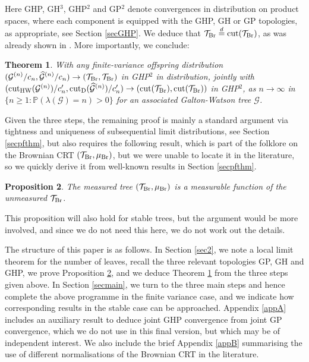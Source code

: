 \documentclass[11pt,a4paper]{article}
\newtheorem{prop}{Proposition}[section]
\newtheorem{thm}[prop]{Theorem}
\newcommand{\bP}{\mathbb{P}}
\newcommand{\cG}{\mathcal{G}}
\newcommand{\cT}{\mathcal{T}}
\newcommand{\modcut}{{\rm cut}_{\rm HW}}
\begin{document}
Here GHP, GH$^3$, GHP$^2$ and GP$^2$ denote convergences in distribution on product spaces, where each component is equipped with the GHP, GH or GP topologies, as appropriate, see Section \ref{secGHP}. We deduce that $\cT_{\rm Br}\overset{d}{=}{\rm cut}(\cT_{\rm Br})$, as was already shown in \cite{BM}. More importantly, we conclude:
\begin{thm}\label{thm1} With any finite-variance offspring distribution $\displaystyle(\cG^{(n)}/c_n,\widehat{\cG}^{(n)}/c_n)\rightarrow(\cT_{\rm Br},\cT_{\rm Br})$ in {\rm GHP}$^2$ in distribution,
  jointly with $(\modcut(\cG^{(n)})/c_n^\prime,{\rm cut}_{\rm D}(\widehat{\cG}^{(n)})/c_n^\prime)\rightarrow({\rm cut}(\cT_{\rm Br}),{\rm cut}(\cT_{\rm Br}))$
  in {\rm GHP}$^2$, as $n\rightarrow\infty$ in $\{n\ge 1\colon\bP(\lambda(\cG)=n)>0\}$ for an associated Galton-Watson tree $\cG$.
\end{thm}
Given the three steps, the remaining proof is mainly a standard argument via tightness and uniqueness of subsequential limit distributions, see Section \ref{secpfthm}, but also requires the following result, which is part of the folklore on the Brownian CRT $(\cT_{\rm Br},\mu_{\rm Br})$, but we were unable to locate it in the literature, so we quickly derive it from well-known results in Section \ref{secpfthm}.

\begin{prop}\label{propintro} The measured tree $(\cT_{\rm Br},\mu_{\rm Br})$ is a measurable function of the unmeasured $\cT_{\rm Br}$.
\end{prop}

This proposition will also hold for stable trees, but the argument would be more involved, and since we do not need this here, we do not work out the details.

The structure of this paper is as follows. In Section \ref{sec2}, we note a local limit theorem for the number of leaves, recall the three relevant topologies GP, GH and
GHP, we prove Proposition \ref{propintro}, and we deduce Theorem \ref{thm1} from the three steps given above. In Section \ref{secmain}, we turn to the three main steps and hence complete the above programme
in the finite variance case, and we indicate how corresponding results in the stable case can be approached. Appendix \ref{appA} includes an auxiliary result to deduce joint GHP convergence from joint GP
convergence, which we do not use in this final version, but which may be of independent interest. We also include the brief Appendix \ref{appB} summarising the use of
different normalisations of the Brownian CRT in the literature.
\end{document}
